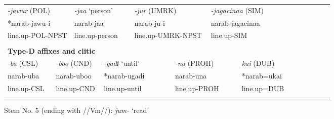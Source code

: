 \begin{tabularx}{\textwidth}{XXXXXXXXXm{}XXXXXXXXXXXX}
\multicolumn{4}{X}{{ \textit{{}-jawur} (POL)}} & \multicolumn{2}{X}{{ \textit{{}-jaa} ‘person’}} & \multicolumn{4}{X}{{ \textit{{}-jur} (UMRK)}} & \multicolumn{4}{X}{{ \textit{{}-jagacinaa} (SIM)}} & \multicolumn{8}{X}{}\\
\multicolumn{4}{X}{{ *narab-jawu-i}} & \multicolumn{2}{X}{{ narab-jaa}} & \multicolumn{4}{X}{narab-ju-i} & \multicolumn{4}{X}{{ narab-jagacinaa}} & \multicolumn{8}{X}{}\\
\multicolumn{4}{X}{line.up-POL-NPST} & \multicolumn{2}{X}{line.up-person} & \multicolumn{4}{X}{line.up-UMRK-NPST} & \multicolumn{4}{X}{line.up-SIM} & \multicolumn{8}{X}{}\\
\multicolumn{22}{X}{}\\
\multicolumn{22}{X}{{\bfseries Type-D affixes and clitic}}\\
\multicolumn{2}{X}{{ \textit{{}-ba} (CSL)}} & \multicolumn{3}{X}{{ \textit{{}-boo} (CND)}} & \multicolumn{3}{X}{{ \textit{{}-gadɨ} ‘until’}} & \multicolumn{4}{X}{{ \textit{{}-na} (PROH)}} & \multicolumn{4}{X}{{ \textit{kai} (DUB)}} & \multicolumn{6}{X}{}\\
\multicolumn{2}{X}{{ narab-uba}} & \multicolumn{3}{X}{{ narab-uboo}} & \multicolumn{3}{X}{{ *narab-ugadɨ}} & \multicolumn{4}{X}{{ narab-una}} & \multicolumn{4}{X}{{ *narab=ukai}} & \multicolumn{6}{X}{}\\
\multicolumn{2}{X}{line.up-CSL} & \multicolumn{3}{X}{line.up-CND} & \multicolumn{3}{X}{line.up-until} & \multicolumn{4}{X}{line.up-PROH} & \multicolumn{4}{X}{line.up=DUB} & \multicolumn{6}{X}{}\\
\lspbottomrule
\end{tabularx}
Stem No. 5 (ending with //Vm//): \textit{jum-} ‘read’

\tablefirsthead{}

